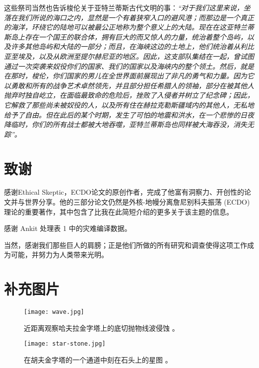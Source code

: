 \documentclass[10pt,twocolumn,letterpaper]{article}
\begin{document}
这些祭司当然也告诉梭伦关于亚特兰蒂斯古代文明的事：\textit{“对于我们这里来说，坐落在我们所说的海口之内，显然是一个有着狭窄入口的避风港；而那边是一个真正的海洋，环绕它的陆地可以被最公正地称为整个意义上的大陆。现在在这亚特兰蒂斯岛上存在一个国王的联合体，拥有巨大的而又惊人的力量，统治着整个岛屿，以及许多其他岛屿和大陆的一部分；而且，在海峡这边的土地上，他们统治着从利比亚至埃及，以及从欧洲至提尔赫尼亚的地区。因此，这支部队集结在一起，曾试图通过一次突袭来奴役你们的国家、我们的国家以及海峡内的整个领土。然后，就是在那时，梭伦，你们国家的男儿在全世界面前展现出了非凡的勇气和力量。因为它以勇敢和所有的战争艺术卓然领先，并且部分担任希腊人的领袖，部分在被其他人抛弃时独自屹立，在面临最致命的危险后，挫败了入侵者并树立了纪念碑；因此，它解救了那些尚未被奴役的人，以及所有住在赫拉克勒斯疆域内的其他人，无私地给予了自由。但在此后的某个时期，发生了可怕的地震和洪水，在一个悲惨的日夜降临时，你们的所有战士都被大地吞噬，亚特兰蒂斯岛也同样被大海吞没，消失无踪”。}

\section{致谢}

感谢Ethical Skeptic，ECDO论文的原创作者，完成了他富有洞察力、开创性的论文并与世界分享。他的三部分论文\cite{1}仍然是外核-地幔分离詹尼别科夫振荡 (ECDO) 理论的重要著作，其中包含了比我在此简短介绍的更多关于该主题的信息。

感谢 Ankit 处理表 1 中的灾难编译数据。

当然，感谢我们那些巨人的肩膀；正是他们所做的所有研究和调查使得这项工作成为可能，并努力为人类带来光明。

\clearpage
\twocolumn

\section{补充图片}

\begin{figure}[H]
\begin{center}
   \texttt{[image: wave.jpg]}
\end{center}
   \caption{近距离观察哈夫拉金字塔上的底切抛物线波侵蚀 \cite{27}。}
\label{fig:19}
\label{fig:onecol}
\end{figure}

\begin{figure}[H]
\begin{center}
   \texttt{[image: star-stone.jpg]}
\end{center}
   \caption{在胡夫金字塔的一个通道中刻在石头上的星图 \cite{28}。}
\label{fig:20}
\label{fig:onecol}
\end{figure}
\end{document}
